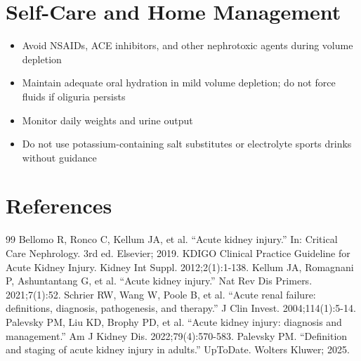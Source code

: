 \section*{Self-Care and Home Management}
\begin{itemize}
  \item Avoid NSAIDs, ACE inhibitors, and other nephrotoxic agents during volume depletion
  \item Maintain adequate oral hydration in mild volume depletion; do not force fluids if oliguria persists
  \item Monitor daily weights and urine output
  \item Do not use potassium-containing salt substitutes or electrolyte sports drinks without guidance
\end{itemize}

\section*{References}
\begin{thebibliography}{99}
 Bellomo R, Ronco C, Kellum JA, et al. ``Acute kidney injury.'' In: Critical Care Nephrology. 3rd ed. Elsevier; 2019.
 KDIGO Clinical Practice Guideline for Acute Kidney Injury. Kidney Int Suppl. 2012;2(1):1-138.
 Kellum JA, Romagnani P, Ashuntantang G, et al. ``Acute kidney injury.'' Nat Rev Dis Primers. 2021;7(1):52.
 Schrier RW, Wang W, Poole B, et al. ``Acute renal failure: definitions, diagnosis, pathogenesis, and therapy.'' J Clin Invest. 2004;114(1):5-14.
 Palevsky PM, Liu KD, Brophy PD, et al. ``Acute kidney injury: diagnosis and management.'' Am J Kidney Dis. 2022;79(4):570-583.
 Palevsky PM. ``Definition and staging of acute kidney injury in adults.'' UpToDate. Wolters Kluwer; 2025.
\end{thebibliography}
